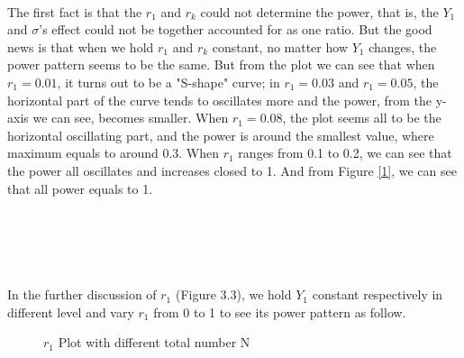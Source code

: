 \documentclass[10pt,english]{article}\usepackage{graphicx, color}
\numberwithin{equation}{section}
\numberwithin{figure}{section}
\begin{document}
\quad\\
The first fact is that the  $r_1$ and $r_k$ could not determine the power, that is, the $Y_1$ and $\sigma$'s effect could not be together accounted for as one ratio. But the good news is that when we hold $r_1$ and $r_k$ constant, no matter how $Y_1$ changes, the power pattern seems to be the same. But from the plot we can see that when $r_1=0.01$, it turns out to be a "S-shape" curve; in $r_1=0.03$ and $r_1=0.05$, the horizontal part of the curve tends to oscillates more and the power, from the y-axis we can see, becomes smaller. When $r_1=0.08$, the plot seems all to be the horizontal oscillating part, and the power is around the smallest value, where maximum equals to around 0.3. When $r_1$ ranges from 0.1 to 0.2, we can see that the power all oscillates and increases closed to 1. And from Figure \ref{1}, we can see that all power equals to 1.\\
\quad\\
\quad\\
\quad\\
\quad\\
\quad\\
In the further discussion of $r_1$ (Figure 3.3), we hold $Y_1$  constant respectively in different level and vary $r_1$ from 0 to 1 to see its power pattern as follow.\\
\begin{figure}[htbp]
\centering{}
\caption{$r_1$ Plot with different total number N}
\end{figure}
\end{document}
